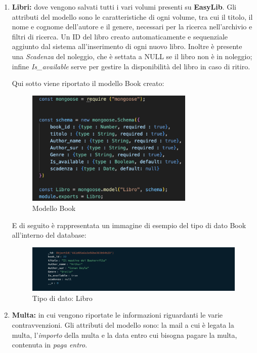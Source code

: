 \documentclass{article}
\begin{document}
\begin{enumerate}
    \item \textbf{Libri:} dove vengono salvati tutti i vari volumi presenti su \textbf{EasyLib}.
    Gli attributi del modello sono le caratteristiche di ogni volume, tra cui il titolo, il nome e cognome dell'autore e il genere, necessari per la ricerca nell'archivio e filtri di ricerca. Un ID del libro creato automaticamente e sequenziale aggiunto dal sistema all'inserimento di ogni nuovo libro.
    Inoltre è presente una \textit{Scadenza}  del noleggio, che è settata a NULL se il libro non è in noleggio; infine \textit{Is\_available} serve per gestire la disponibilità del libro in caso di ritiro.
    
    Qui sotto viene riportato il modello Book creato:
    \begin{figure}[H]
        \centering
        \includegraphics[width=80mm]{D4/Images/ModelBook.png}
        \caption{Modello Book}
    \end{figure}

    E di seguito è rappresentata un immagine di esempio del tipo di dato Book all'interno del database:
    
    \begin{figure}[H]
        \centering
        \includegraphics[width=130mm]{D4/Images/LibroDB.png}
        \caption{Tipo di dato: Libro}
    \end{figure}

    \item \textbf{Multa:} in cui vengono riportate le informazioni riguardanti le varie contravvenzioni.
    Gli attributi del modello sono: la mail a cui è legata la multa, l'\textit{importo} della multa e la data entro cui bisogna pagare la multa,  contenuta in \textit{paga entro}.
    

\end{enumerate}
\end{document}
